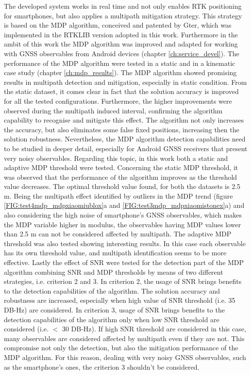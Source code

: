 The developed system works in real time and not only enables RTK positioning for smartphones, but also applies a multipath mitigation strategy. This strategy is based on the MDP algorithm, conceived and patented by Gter, which was implemented in the RTKLIB version adopted in this work. Furthermore in the ambit of this work the MDP algorithm was improved and adapted for working with GNSS observables from Android devices (chapter \ref{ch:service_devel}). The performance of the MDP algorithm were tested in a static and in a kinematic case study (chapter \ref{ch:mdp_results}). The MDP algorithm showed promising results in multipath detection and mitigation, especially in static condition. From the static dataset, it comes clear in fact that the solution accuracy is improved for all the tested configurations. Furthermore, the higher improvements were observed during the multipath induced interval, confirming the algorithm capability to recognise and mitigate this effect. The algorithm not only increases the accuracy, but also eliminates some false fixed positions, increasing then the solution robustness.
Nevertheless, the MDP algorithm detection capabilities need to be studied in deeper detail, especially for Android GNSS receivers that present very noisy observables. Regarding this topic, in this work both a static and adaptive MDP threshold were tested. Concerning the static MDP threshold, it was observed that the performance of the algorithm improves as the threshold value decreases. The optimal threshold value found, for both the datasets is 2.5 m. Being the multipath effect identified by outliers in the MDP trend (figure \ref{FIG:test4mdp_mdpxiaomiublox}a and \ref{FIG:test3mdp_mdpxiaomistonex}a) and also considering the high noise of smartphone's GNSS observables, which makes the MDP variable higher in modulus, the observables having MDP values lower than 2.5 m can not be considered affected by multipath. The adaptive MDP threshold was also tested showing interesting results. In this case each observable has its own threshold value, and multipath identification seems to be more effective. Lastly the effect of SNR were tested for the detection part of the MDP algorithm combining SNR and MDP thresholds by means of two different strategies, i.e. criterion 2 and 3. In criterion 2, the usage of SNR brings benefits to the detection capabilities of the algorithm. The solution accuracy and robustness are increased, especially when high value of SNR threshold (i.e. 35 DB-Hz) are considered. In criterion 3, usage of SNR brings benefits to the detection capabilities of the algorithm only when low SNR threshold are considered (i.e. $<$ 30 DB-Hz). If high SNR threshold are considered in this case, many observables are considered affected by multipath even if they are not. This compromise not only the detection, but also the mitigation performance of the MDP algorithm. For this reason, dealing with very noisy GNSS observables, such as the smartphone's ones, the criterion 3 shouldn't be considered.

